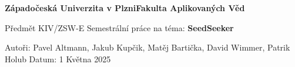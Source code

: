 \documentclass[12pt, a4paper]{report}
\begin{document}

\begin{center}
		\Large{\textbf{Západočeská Univerzita v Plzni\break Fakulta Aplikovaných Věd}}

		\vspace{\fill}
		\normalsize{Předmět KIV/ZSW-E\break
		Semestrální práce na téma:\break}
		\Large{\textbf{SeedSeeker}}

		\vspace{\fill}
		\normalsize{Autoři: Pavel Altmann, Jakub Kupčik,\hspace{\fill}\break
			Matěj Bartička, David Wimmer, Patrik Holub
		\hspace{\fill}Datum: 1 Května 2025}
\end{center}
\newpage

\setcounter{page}{2}
\tableofcontents
\newpage
\end{document}
